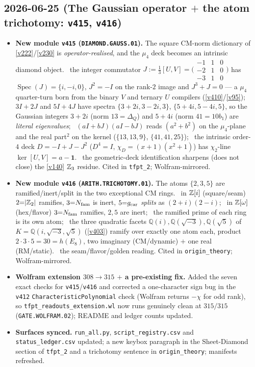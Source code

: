 \subsection*{2026-06-25 (The Gaussian operator $+$ the atom trichotomy: \texttt{v415}, \texttt{v416})}
\begin{itemize}
\item \textbf{New module \texttt{v415} (\texttt{DIAMOND.GAUSS.01}).} The square CM-norm dictionary of
\vref{v222}/\vref{v230} is \emph{operator-realised}, and the $\mu_4$ deck becomes an intrinsic diamond
object. \mE\ the integer commutator $J:=\tfrac13[U,V]=\big(\begin{smallmatrix}-1&1&0\\-2&1&0\\-3&1&0\end{smallmatrix}\big)$
has $\operatorname{Spec}(J)=\{i,-i,0\}$, $J^2=-I$ on the rank-$2$ image and $J^3+J=0$ --- a $\mu_4$
quarter-turn born from the binary $V$ and ternary $U$ compilers (\vref{v410}/\vref{v95}); \mE\ $3I+2J$ and
$5I+4J$ have spectra $\{3{+}2i,3{-}2i,3\}$, $\{5{+}4i,5{-}4i,5\}$, so the Gaussian integers $3{+}2i$ (norm
$13{=}\Delta_Q$) and $5{+}4i$ (norm $41{=}10b_1$) are \emph{literal eigenvalues}; \mE\ $(aI{+}bJ)(aI{-}bJ)$
reads $(a^2{+}b^2)$ on the $\mu_4$-plane and the real part$^2$ on the kernel ($\{13,13,9\}$, $\{41,41,25\}$);
\mE\ the intrinsic order-$4$ deck $D=-I+J-J^2$ ($D^4=I$, $\chi_D=(x{+}1)(x^2{+}1)$) has $\chi_2$-line
$\ker[U,V]=a-\mathbf 1$. \mC\ the geometric-deck identification sharpens (does not close) the \vref{v140}
$\mathbb{Z}_3$ residue. Cited in \texttt{tfpt\_2}; Wolfram-mirrored.
\item \textbf{New module \texttt{v416} (\texttt{ARITH.TRICHOTOMY.01}).} The atoms $\{2,3,5\}$ are
ramified/inert/split in the two exceptional CM rings. \mE\ in $\mathbb{Z}[i]$ (square/seam) $2{=}|\mathbb{Z}_2|$ ramifies,
$3{=}N_{\mathrm{fam}}$ is inert, $5{=}g_{\mathrm{car}}$ \emph{splits} as $(2{+}i)(2{-}i)$; \mE\ in $\mathbb{Z}[\omega]$ (hex/flavor)
$3{=}N_{\mathrm{fam}}$ ramifies, $2,5$ are inert; \mE\ the ramified prime of each ring is its own atom; \mE\ the three
quadratic facets $\mathbb Q(i),\mathbb Q(\sqrt{-3}),\mathbb Q(\sqrt5)$ of $K=\mathbb Q(i,\sqrt{-3},\sqrt5)$
(\vref{v403}) ramify over exactly one atom each, product $2\cdot3\cdot5=30=h(E_8)$, two imaginary
(CM/dynamic) $+$ one real (RM/static). \mC\ the seam/flavor/golden reading. Cited in
\texttt{origin\_theory}; Wolfram-mirrored.
\item \textbf{Wolfram extension $308\to315$ $+$ a pre-existing fix.} Added the seven exact checks for
\texttt{v415}/\texttt{v416} and corrected a one-character sign bug in the \texttt{v412}
\texttt{CharacteristicPolynomial} check (Wolfram returns $-\chi$ for odd rank), so
\texttt{tfpt\_readouts\_extension.wl} now runs genuinely clean at $315/315$ (\texttt{GATE.WOLFRAM.02});
README and ledger counts updated.
\item \textbf{Surfaces synced.} \texttt{run\_all.py}, \texttt{script\_registry.csv} and
\texttt{status\_ledger.csv} updated; a new keybox paragraph in the Sheet-Diamond section of \texttt{tfpt\_2}
and a trichotomy sentence in \texttt{origin\_theory}; manifests refreshed.
\end{itemize}

